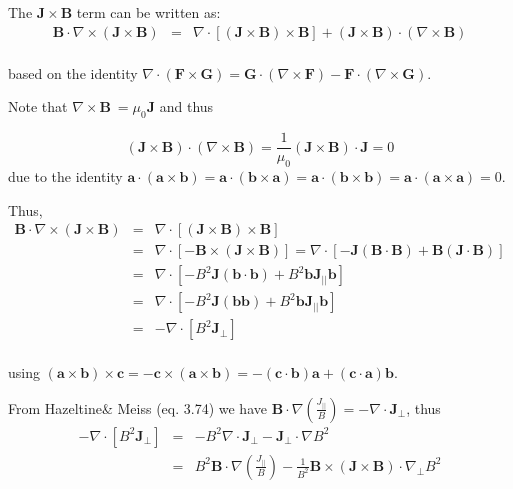 \documentclass[12pt, a4paper]{article}
\newcommand{\Vec}[1]{\ensuremath{\mathbf{#1}}}
\newcommand{\Bvec}{\Vec{B}}
\newcommand{\Jvec}{\Vec{J}}
\newcommand{\Jpar}{J_{||}}
\begin{document}
The $\Jvec\times\Bvec$ term can be written as:
\begin{eqnarray}
\Bvec\cdot\nabla\times\left(\Jvec\times\Bvec\right) &=& \nabla\cdot\left[\left(\Jvec\times\Bvec\right)\times\Bvec\right]+\left(\Jvec\times\Bvec\right)\cdot\left(\nabla\times\Bvec\right) \nonumber \\
\end{eqnarray}

based on the identity $\nabla\cdot(\mathbf{F}\times\mathbf{G})= \mathbf{G}\cdot(\nabla\times\mathbf{F}) - \mathbf{F}\cdot(\nabla\times\mathbf{G})$. 

Note that $\nabla\times\Bvec\ = \mu_0\Jvec$ and thus 

\[
\left(\Jvec\times\Bvec\right)\cdot\left(\nabla\times\Bvec\right)=\frac{1}{\mu_0}\left(\Jvec\times\Bvec\right)\cdot\Jvec = 0
\]
due to the identity 
$
\mathbf{a} \cdot (\mathbf{a} \times \mathbf{b}) = \mathbf{a} \cdot (\mathbf{b} \times \mathbf{a}) = \mathbf{a} \cdot (\mathbf{b} \times \mathbf{b}) = \mathbf{a} \cdot (\mathbf{a} \times \mathbf{a}) = 0
$.  

Thus,
\begin{eqnarray}
\Bvec\cdot\nabla\times\left(\Jvec\times\Bvec\right) &=& \nabla\cdot\left[\left(\Jvec\times\Bvec\right)\times\Bvec\right]\\
&=& \nabla\cdot\left[-\Bvec\times\left(\Jvec\times\Bvec\right)\right] = \nabla\cdot\left[ - \Jvec\left(\Bvec\cdot\Bvec\right)+\Bvec\left(\Jvec\cdot\Bvec\right)\right]\\
&=& \nabla\cdot\left[-{B^2}\Jvec\left(\Vec{b}\cdot\Vec{b}\right)+{B^2}\Vec{b}\Jvec_{||}\Vec{b}\right]\\
&=& \nabla\cdot\left[-{B^2}\Jvec\left(\Vec{b}\Vec{b}\right)+{B^2}\Vec{b}\Jvec_{||}\Vec{b}\right]\\
&=& -\nabla\cdot\left[{B^2}\Jvec_\perp\right]\\
\end{eqnarray}

using $(\mathbf{a}\times \mathbf{b})\times \mathbf{c} = -\mathbf{c}\times(\mathbf{a}\times \mathbf{b}) = -(\mathbf{c}\cdot\mathbf{b})\mathbf{a} + (\mathbf{c}\cdot\mathbf{a})\mathbf{b}$.


From Hazeltine\& Meiss (eq. 3.74) we have $\Bvec\cdot\nabla\left(\frac{\Jpar}{B}\right)=-\nabla\cdot\Jvec_{\perp}$, thus
\begin{eqnarray}
 -\nabla\cdot\left[{B^2}\Jvec_\perp\right] &=& -B^2\nabla\cdot\Jvec_{\perp}-\Jvec_{\perp}\cdot\nabla B^2\\
&=&B^2\Bvec\cdot\nabla\left(\frac{J_{||}}{B}\right) - \frac{1}{B^2}\Bvec\times\left(\Jvec\times\Bvec\right)\cdot\nabla_\perp B^2
\end{eqnarray}
\end{document}
